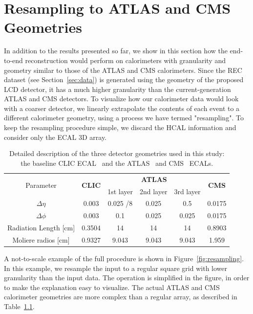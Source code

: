 \chapter{Resampling to ATLAS and CMS Geometries}\label{sec:resampling}

In addition to the results presented so far, we show in this section how the end-to-end reconstruction would perform on calorimeters with granularity and geometry similar to those of the ATLAS and CMS calorimeters. Since the REC dataset (see Section~\ref{sec:data}) is generated using the geometry of the proposed LCD detector, it has a much higher granularity than the current-generation ATLAS and CMS detectors. To visualize how our calorimeter data would look with a coarser detector, we linearly extrapolate the contents of each event to a different calorimeter geometry, using a process we have termed "resampling". To keep the resampling procedure simple, we discard the HCAL information and consider only the ECAL 3D array.

\begin{table}[tbp]
\centering
\caption{Detailed description of the three detector geometries used in this study: the baseline CLIC ECAL~\cite{CLIC_geometry} and the ATLAS~\cite{Aad:2008zzm} and CMS~\cite{Chatrchyan:2008aa} ECALs.\label{tab:resampling_geometry}}
\begin{tabular}{c|c|ccc|c}
\hline
\multirow{2}{*}{Parameter} & \multirow{2}{*}{\textbf{CLIC}} & \multicolumn{3}{c|}{\textbf{ATLAS}} & \multirow{2}{*}{\textbf{CMS}} \\
            &               & 1st layer & 2nd layer & 3rd layer & \\
\hline
$\Delta \eta$         & 0.003  & 0.025 /8 & 0.025 & 0.5   & 0.0175 \\
$\Delta \phi$         & 0.003  & 0.1      & 0.025 & 0.025 & 0.0175 \\
Radiation Length [cm] & 0.3504 & 14       & 14    & 14    & 0.8903 \\
Moliere radios [cm]   & 0.9327 & 9.043    & 9.043 & 9.043 & 1.959  \\
\hline 
\end{tabular}
\end{table}

A not-to-scale example of the full procedure is shown in Figure~\ref{fig:resampling}. In this example, we resample the input to a regular square grid with lower granularity than the input data. The operation is simplified in the figure, in order to make the explanation easy to visualize. The actual ATLAS and CMS calorimeter geometries are more complex than a regular array, as described in Table~\ref{tab:resampling_geometry}.

